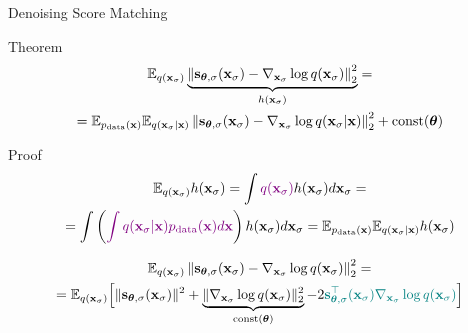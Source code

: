\documentclass{beamer}
\renewcommand{\eqpause}{}
\renewcommand{\nextonslide}[1]{#1}
\begin{document}
\begin{frame}{Denoising Score Matching}
	\begin{block}{Theorem}
	\vspace{-0.5cm}
	\begin{multline*}
		\mathbb{E}_{q(\mathbf{x}_{\sigma})}\underbrace{\left\| \mathbf{s}_{\boldsymbol{\theta}, \sigma}(\mathbf{x}_{\sigma}) - \nabla_{\mathbf{x}_{\sigma}} \log q(\mathbf{x}_{\sigma}) \right\|_2^2}_{h(\mathbf{x}_{\sigma})} = \\
		= \mathbb{E}_{p_{\text{data}}(\mathbf{x})} \mathbb{E}_{q(\mathbf{x}_{\sigma} | \mathbf{x})}\left\| \mathbf{s}_{\boldsymbol{\theta}, \sigma}(\mathbf{x}_{\sigma}) - \nabla_{\mathbf{x}_{\sigma}} \log q(\mathbf{x}_{\sigma} | \mathbf{x}) \right\|_2^2 + \text{const}(\boldsymbol{\theta})
	\end{multline*}
	\vspace{-0.5cm}
	\end{block}
    \eqpause
	\begin{block}{Proof}
		\vspace{-0.7cm}
		\begin{multline*}
			\bbE_{q(\bx_{\sigma})} h(\bx_{\sigma}) = \int {\color{violet}q(\bx_{\sigma})} h(\bx_{\sigma}) d\bx_{\sigma} 
			\nextonslide{= \\ = \int \left({\color{violet}\int q(\bx_{\sigma} | \bx) \pd(\bx) d\bx}\right) h(\bx_{\sigma}) d\bx_{\sigma} =  \bbE_{\pd(\bx)} \bbE_{q(\bx_{\sigma} | \bx)}  h(\bx_{\sigma})}
		\end{multline*}
        \eqpause
		\vspace{-0.7cm}
		{\small
		\begin{multline*}
			\bbE_{q(\bx_{\sigma})}\left\| \bs_{\btheta, \sigma}(\bx_{\sigma}) - \nabla_{\bx_{\sigma}} \log q(\bx_{\sigma}) \right\|_2^2 = \\ 
			\nextonslide{= \bbE_{q(\bx_{\sigma})} \Bigl[\| \bs_{\btheta, \sigma}(\bx_{\sigma}) \|^2 + \underbrace{\| \nabla_{\bx_{\sigma}} \log q(\bx_{\sigma}) \|_2^2}_{\text{const}(\btheta)} - 2 {\color{teal}\bs_{\btheta, \sigma}^\top(\bx_{\sigma}) \nabla_{\bx_{\sigma}} \log q(\bx_{\sigma})} \Bigr]}
		\end{multline*}
		}
	\end{block}
\end{frame}
\end{document}
